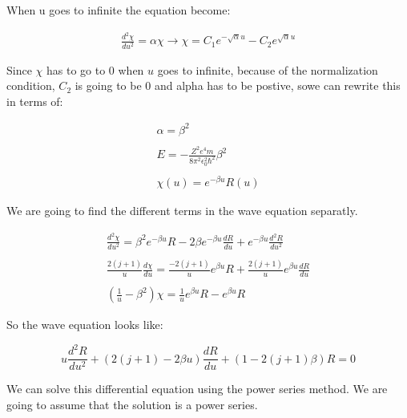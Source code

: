 When u goes to infinite the equation become:

\begin{equation}
  \begin{array}{c}
    \frac{d^2\chi}{du^2} = \alpha\chi \rightarrow \chi = C_1 e^{-\sqrt{\alpha}u} - C_2 e^{\sqrt{\alpha}u}
  \end{array}
\end{equation}

Since $\chi$ has to go to 0 when $u$ goes to infinite, because of the normalization condition, $C_2$ is going to be 0 and alpha has to be postive, sowe can rewrite this in terms of:

\begin{equation}
  \begin{array}{c}
    \alpha=\beta^2
    \\

    \\
    E = -\frac{Z^2e^4m}{8\pi^2\epsilon_0^2\hbar^2}\beta^2
    \\

    \\
    \chi(u) = e^{-\beta u}R(u)
  \end{array}
\end{equation}

We are going to find the different terms in the wave equation separatly.

\begin{equation}
  \begin{array}{c}
    \frac{d^2\chi}{du^2} = \beta^2 e^{-\beta u} R - 2\beta e^{-\beta u} \frac{dR}{du}+e^{-\beta u} \frac{d^2R}{du^2}
    \\

    \\
    \frac{2(j+1)}{u} \frac{d\chi}{du} = \frac{-2(j+1)}{u} e^{\beta u} R + \frac{2(j+1)}{u} e^{\beta u} \frac{dR}{du}
    \\

    \\
    \left(\frac{1}{u}-\beta^2\right)\chi = \frac{1}{u} e^{\beta u}R -e^{\beta u} R
  \end{array}
\end{equation}

So the wave equation looks like:

\begin{equation}
  u\frac{d^2R}{du^2}+(2(j+1)-2\beta u)\frac{dR}{du} + (1 - 2(j+1)\beta)R = 0
\end{equation}

We can solve this differential equation using the power series method. We are going to assume that the solution is a power series.

